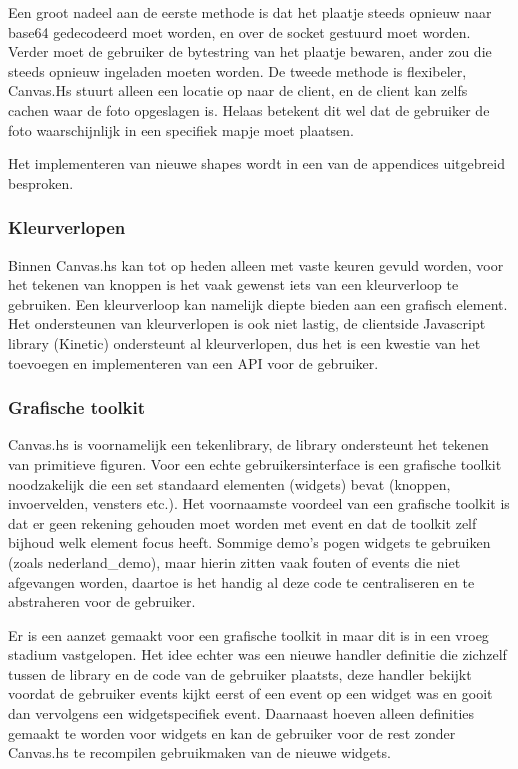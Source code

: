 Een groot nadeel aan de eerste methode is dat het plaatje steeds opnieuw naar base64 gedecodeerd moet worden, en over de socket gestuurd moet worden. Verder moet de gebruiker de bytestring van het plaatje bewaren, ander zou die steeds opnieuw ingeladen moeten worden. De tweede methode is flexibeler, Canvas.Hs stuurt alleen een locatie op naar de client, en de client kan zelfs cachen waar de foto opgeslagen is. Helaas betekent dit wel dat de gebruiker de foto waarschijnlijk in een specifiek mapje moet plaatsen.

Het implementeren van nieuwe shapes wordt in een van de appendices uitgebreid besproken.

\subsubsection{Kleurverlopen}
Binnen Canvas.hs kan tot op heden alleen met vaste keuren gevuld worden, voor het tekenen van knoppen is het vaak gewenst iets van een kleurverloop te gebruiken. Een kleurverloop kan namelijk diepte bieden aan een grafisch element. Het ondersteunen van kleurverlopen is ook niet lastig, de clientside Javascript library (Kinetic) ondersteunt al kleurverlopen, dus het is een kwestie van het toevoegen en implementeren van een API voor de gebruiker.

\subsubsection{Grafische toolkit}
Canvas.hs is voornamelijk een tekenlibrary, de library ondersteunt het tekenen van primitieve figuren. Voor een echte gebruikersinterface is een grafische toolkit noodzakelijk die een set standaard elementen (widgets) bevat (knoppen, invoervelden, vensters etc.). Het voornaamste voordeel van een grafische toolkit is dat er geen rekening gehouden moet worden met event en dat de toolkit zelf bijhoud welk element focus heeft. Sommige demo's pogen widgets te gebruiken (zoals nederland_demo), maar hierin zitten vaak fouten of events die niet afgevangen worden, daartoe is het handig al deze code te centraliseren en te abstraheren voor de gebruiker.

Er is een aanzet gemaakt voor een grafische toolkit in  maar dit is in een vroeg stadium vastgelopen. Het idee echter was een nieuwe handler definitie die zichzelf tussen de library en de code van de gebruiker plaatsts, deze handler bekijkt voordat de gebruiker events kijkt eerst of een event op een widget was en gooit dan vervolgens een widgetspecifiek event. Daarnaast hoeven alleen definities gemaakt te worden voor widgets en kan de gebruiker voor de rest zonder Canvas.hs te recompilen gebruikmaken van de nieuwe widgets.

